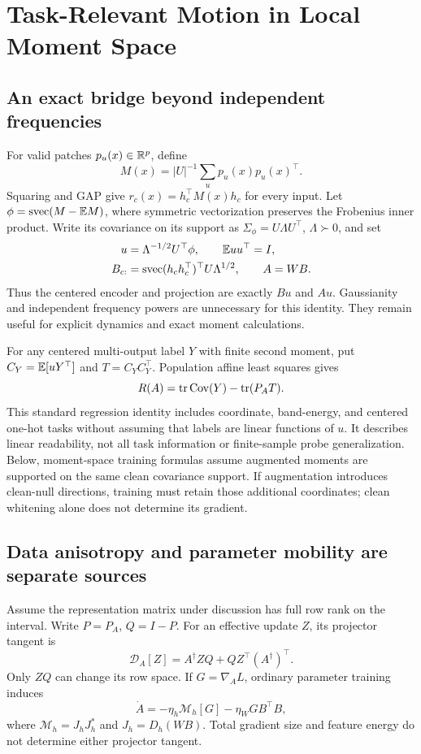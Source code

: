 \section{Task-Relevant Motion in Local Moment Space}
\label{sec:task-geometry}
\subsection{An exact bridge beyond independent frequencies}
For valid patches $p_u(x)\in\mathbb R^p$, define
\begin{equation}
 M(x)=|U|^{-1}\sum_u p_u(x)p_u(x)^\top.
\end{equation}
Squaring and GAP give $r_c(x)=h_c^\top M(x)h_c$ for every input. Let $\phi=\operatorname{svec}(M-\mathbb E M)$, where symmetric vectorization preserves the Frobenius inner product. Write its covariance on its support as $\Sigma_\phi=U\Lambda U^\top$, $\Lambda\succ0$, and set
\begin{align}
 u&=\Lambda^{-1/2}U^\top\phi,\qquad \mathbb E uu^\top=I,\\
 B_{c:}&=\operatorname{svec}(h_ch_c^\top)^\top U\Lambda^{1/2},\qquad A=WB.
\end{align}
Thus the centered encoder and projection are exactly $Bu$ and $Au$. Gaussianity and independent frequency powers are unnecessary for this identity. They remain useful for explicit dynamics and exact moment calculations.

For any centered multi-output label $Y$ with finite second moment, put $C_Y=\mathbb E[uY^\top]$ and $T=C_YC_Y^\top$. Population affine least squares gives
\begin{equation}
 R(A)=\operatorname{tr}\operatorname{Cov}(Y)-\operatorname{tr}(P_AT).
 \label{eq:general-task-risk}
\end{equation}
This standard regression identity includes coordinate, band-energy, and centered one-hot tasks without assuming that labels are linear functions of $u$. It describes linear readability, not all task information or finite-sample probe generalization. Below, moment-space training formulas assume augmented moments are supported on the same clean covariance support. If augmentation introduces clean-null directions, training must retain those additional coordinates; clean whitening alone does not determine its gradient.

\subsection{Data anisotropy and parameter mobility are separate sources}
Assume the representation matrix under discussion has full row rank on the interval. Write $P=P_A$, $Q=I-P$. For an effective update $Z$, its projector tangent is
\begin{equation}
 \mathcal D_A[Z]=A^\dagger ZQ+QZ^\top(A^\dagger)^\top.
 \label{eq:projector-tangent}
\end{equation}
Only $ZQ$ can change its row space. If $G=\nabla_A L$, ordinary parameter training induces
\begin{equation}
 \dot A=-\eta_h\mathcal M_h[G]-\eta_WGB^\top B,
 \label{eq:mobility-split}
\end{equation}
where $\mathcal M_h=J_hJ_h^*$ and $J_h=D_h(WB)$. Total gradient size and feature energy do not determine either projector tangent.

